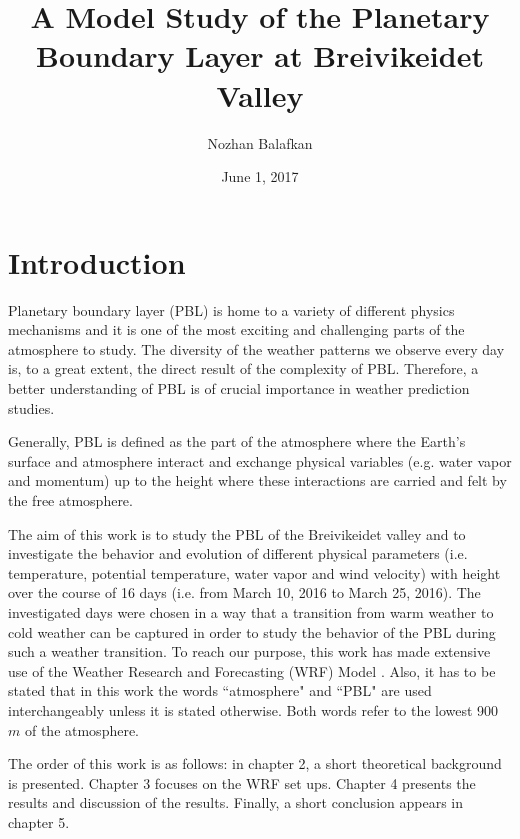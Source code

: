 \documentclass[a4paper,12pt]{article}
\author{Nozhan Balafkan}
\date{June 1, 2017}
\title{A Model Study of the Planetary Boundary Layer at Breivikeidet Valley}
\numberwithin{equation}{section} %
\begin{document}
\clearpage\maketitle	%
\thispagestyle{empty}
\newpage


\tableofcontents
{}
\setcounter{page}{1}

\newpage
{}

\section{Introduction}

Planetary boundary layer (PBL) is home to a variety of different physics mechanisms and it is one of the most exciting and challenging parts of the atmosphere to study. The diversity of the weather patterns we observe every day is, to a great extent, the direct result of the complexity of PBL. Therefore, a better understanding of PBL is of crucial importance in weather prediction studies. 

Generally, PBL is defined as the part of the atmosphere where the Earth's surface and atmosphere interact and exchange physical variables (e.g. water vapor and momentum) up to the height where these interactions are carried and felt by the free atmosphere.


The aim of this work is to study the PBL of the Breivikeidet valley and to investigate the behavior and evolution of different physical parameters (i.e. temperature, potential temperature, water vapor and wind velocity) with height over the course of 16 days (i.e. from March 10, 2016 to March 25, 2016). The investigated days were chosen in a way that a transition from warm weather to cold weather can be captured in order to study the behavior of the PBL during such a weather transition. To reach our purpose, this work has made extensive use of the Weather Research and Forecasting (WRF) Model \citep{wrf3}. Also, it has to be stated that in this work the words ``atmosphere" and ``PBL" are used interchangeably unless it is stated otherwise. Both words refer to the lowest 900 $m$ of the atmosphere.

The order of this work is as follows: in chapter 2, a short theoretical background is presented. Chapter 3 focuses on the WRF set ups. Chapter 4 presents the results and discussion of the results. Finally, a short conclusion appears in chapter 5.
\end{document}
